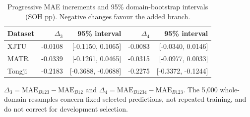 \begin{table}[!htbp]\centering
\caption{Progressive MAE increments and 95\% domain-bootstrap intervals (SOH pp). Negative changes favour the added branch.}\label{tab:branchintervals}
\papertablesize\setlength{\tabcolsep}{4pt}\renewcommand{\arraystretch}{1.15}
\begin{tabular}{lrrrr}\toprule
Dataset & $\Delta_3$ & 95\% interval & $\Delta_4$ & 95\% interval \\ \midrule
XJTU & -0.0108 & [-0.1150, 0.1065] & -0.0083 & [-0.0340, 0.0146] \\
MATR & -0.0339 & [-0.1261, 0.0465] & -0.0315 & [-0.0977, 0.0033] \\
Tongji & -0.2183 & [-0.3688, -0.0688] & -0.2275 & [-0.3372, -0.1244] \\
\bottomrule\end{tabular}
\par\smallskip\begin{minipage}{\linewidth}\papertablesize $\Delta_3=\mathrm{MAE}_{B123}-\mathrm{MAE}_{B12}$ and $\Delta_4=\mathrm{MAE}_{B1234}-\mathrm{MAE}_{B123}$. The 5,000 whole-domain resamples concern fixed selected predictions, not repeated training, and do not correct for development selection.\end{minipage}
\end{table}
